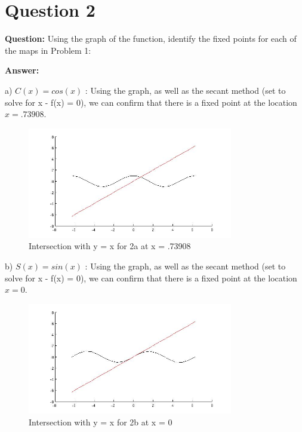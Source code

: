 \documentclass[12pt]{article}
\newenvironment{myenv}{\begin{adjustwidth}{1cm}{}}{\end{adjustwidth}}
\begin{document}
\section*{Question 2}
\begin{myenv}
\textbf{Question:} Using the graph of the function, identify the fixed points for each of the maps in Problem 1:

\textbf{Answer:} 

a) $C(x) = cos(x)$ : Using the graph, as well as the secant method (set to solve for x - f(x) = 0), we can confirm that there is a fixed point at the location $ x = .73908$.

\begin{figure} [H]
    \centering
    \includegraphics[width=0.8\textwidth]{secant2a}
    \caption{Intersection with y = x for 2a at x = .73908}
    \label{figure:a4}
\end{figure}

b) $S(x) = sin(x)$ : Using the graph, as well as the secant method (set to solve for x - f(x) = 0), we can confirm that there is a fixed point at the location $ x = 0$.

\begin{figure} [H]
    \centering
    \includegraphics[width=0.8\textwidth]{secant2b}
    \caption{Intersection with y = x for 2b at x = 0}
    \label{figure:a4}
\end{figure}


\end{myenv}
\end{document}
